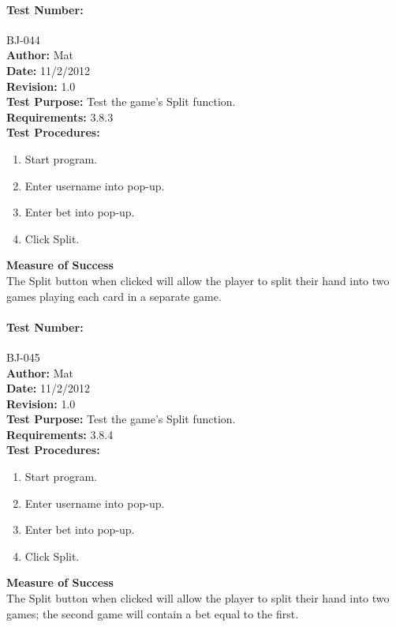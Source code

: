 \documentclass{article}
\begin{document}
\paragraph{Test Number:} BJ-044\\
\textbf{Author:} Mat\\
\textbf{Date:} 11/2/2012\\
\textbf{Revision:} 1.0\\
\textbf{Test Purpose:} Test the game's Split function.\\
\textbf{Requirements:} 3.8.3 \\
\textbf{Test Procedures:} 
\begin{enumerate}
\item Start program.
\item Enter username into pop-up.
\item Enter bet into pop-up.
\item Click Split.
\end{enumerate}
\textbf{Measure of Success}\\The Split button when clicked will allow the player to split their hand into two games playing each card in a separate game.
\paragraph{Test Number:} BJ-045\\
\textbf{Author:} Mat\\
\textbf{Date:} 11/2/2012\\
\textbf{Revision:} 1.0\\
\textbf{Test Purpose:} Test the game's Split function.\\
\textbf{Requirements:} 3.8.4 \\
\textbf{Test Procedures:} 
\begin{enumerate}
\item Start program.
\item Enter username into pop-up.
\item Enter bet into pop-up.
\item Click Split.
\end{enumerate}
\textbf{Measure of Success}\\The Split button when clicked will allow the player to split their hand into two games; the second game will contain a bet equal to the first.
\end{document}
